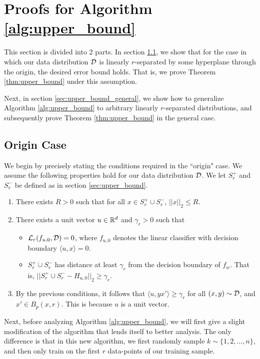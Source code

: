 \section{Proofs for Algorithm \ref{alg:upper_bound}}\label{sec:upper_bound_details}

This section is divided into 2 parts. In section \ref{sec:upper_bound_origin}, we show that for the case in which our data distribution ${\mathcal D}$ is linearly $r$-separated by some hyperplane through the origin, the desired error bound holds. That is, we prove Theorem \ref{thm:upper_bound} under this assumption.

Next, in section \ref{sec:upper_bound_general}, we show how to generalize Algorithm \ref{alg:upper_bound} to arbitrary linearly $r$-separated distributions, and subsequently prove Theorem \ref{thm:upper_bound} in the general case.

\subsection{Origin Case}\label{sec:upper_bound_origin}

We begin by precisely stating the conditions required in the ``origin" case. We assume the following properties hold for our data distribution ${\mathcal D}$. We let $S_r^+$ and $S_r^-$ be defined as in section \ref{sec:upper_bound}.

\begin{enumerate}
	\item There exists $R > 0$ such that for all $x \in S_r^+ \cup S_r^-$, $||x||_2 \leq R$.
	\item There exists a unit vector $u \in \mathbb R^d$ and $\gamma_r > 0$ such that 
	\begin{itemize}
		\item $\mathcal L_r(f_{u, 0}, {\mathcal D}) = 0$, where $f_{u, 0}$ denotes the linear classifier with decision boundary $\langle u, x \rangle = 0$. 
		\item $S_r^+ \cup S_r^-$ has distance at least $\gamma_r$ from the decision boundary of $f_w$. That is, $||S_r^+ \cup S_r^- - H_{u, 0}||_2 \geq \gamma_r$.
	\end{itemize}
	\item By the previous conditions, it follows that $\langle u, yx' \rangle \geq \gamma_r$ for all $(x,y) \sim {\mathcal D}$, and $x' \in B_p(x, r)$. This is because $u$ is a unit vector. 
\end{enumerate}

Next, before analyzing Algorithm \ref{alg:upper_bound}, we will first give a slight modification of the algorithm that lends itself to better analysis. The only difference is that in this new algorithm, we first randomly sample $k \sim \{1, 2, \dots, n\}$, and then only train on the first $r$ data-points of our training sample.

